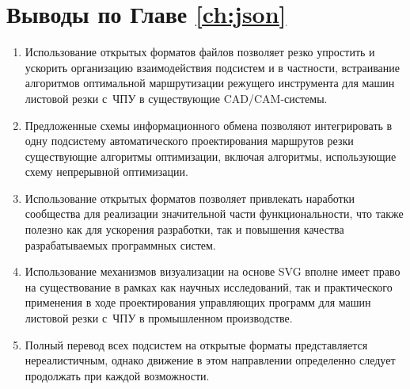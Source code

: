
\section{Выводы по Главе \ref{ch:json}}
\label{sec:json.conclude}

\begin{enumerate}
  \item
  Использование открытых форматов файлов
  позволяет резко упростить и ускорить
  организацию взаимодействия подсистем
  и в частности,
  встраивание алгоритмов оптимальной маршрутизации
  режущего инструмента для машин листовой
  резки с~ЧПУ в существующие
  CAD/CAM-системы.
  \item
  Предложенные схемы информационного обмена
  позволяют интегрировать в одну подсистему
  автоматического проектирования маршрутов резки
  существующие алгоритмы оптимизации,
  включая алгоритмы,
  использующие схему непрерывной оптимизации.
  \item
  Использование открытых форматов
  позволяет привлекать наработки
  сообщества для реализации
  значительной части функциональности,
  что также полезно как для ускорения
  разработки,
  так и повышения качества разрабатываемых
  программных систем.
  \item
  Использование механизмов визуализации
  на основе SVG вполне имеет право на существование
  в рамках как научных исследований,
  так и практического применения
  в ходе проектирования управляющих программ
  для машин листовой
  резки с~ЧПУ
  в промышленном производстве.
  \item
  Полный перевод всех подсистем на открытые
  форматы представляется нереалистичным,
  однако движение в этом направлении
  определенно следует продолжать
  при каждой возможности.
\end{enumerate}
